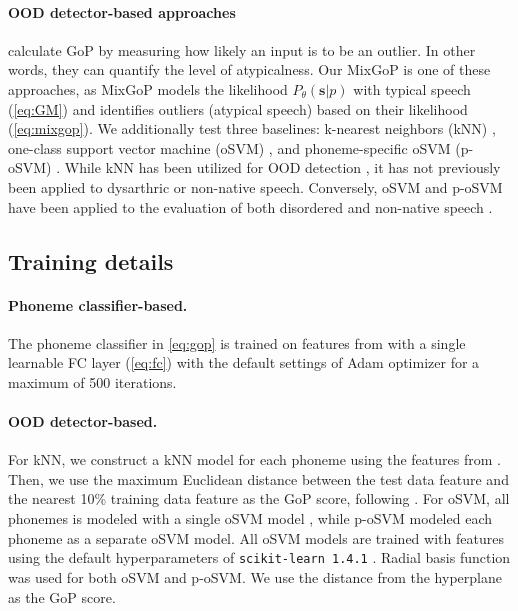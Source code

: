 \paragraph{OOD detector-based approaches} calculate GoP by measuring how likely an input is to be an outlier.
In other words, they can quantify the level of atypicalness.
Our MixGoP is one of these approaches, as MixGoP models the likelihood $P_\theta(\mathbf{s}|p)$ with typical speech (\cref{eq:GM}) and identifies outliers (atypical speech) based on their likelihood (\cref{eq:mixgop}). 
We additionally test three baselines: k-nearest neighbors (kNN) \citep{sun2022out}, one-class support vector machine (oSVM) \citep{scholkopf2001estimating}, and phoneme-specific oSVM (p-oSVM) \citep{shahin2019anomaly}. 
While kNN has been utilized for OOD detection \citep{sun2022out}, it has not previously been applied to dysarthric or non-native speech.
Conversely, oSVM and p-oSVM have been applied to the evaluation of both disordered and non-native speech \citep{shahin2019anomaly, shahin2023phonological}.


\subsection{Training details}\label{subsec:training}
\paragraph{Phoneme classifier-based.}
The phoneme classifier in \cref{eq:gop} is trained on features from  with a single learnable FC layer (\cref{eq:fc}) with the default settings of Adam optimizer \citep{DBLP:journals/corr/KingmaB14} for a maximum of 500 iterations.


\paragraph{OOD detector-based.}
For kNN, we construct a kNN model for each phoneme using the features from .
Then, we use the maximum Euclidean distance between the test data feature and the nearest 10\% training data feature as the GoP score, following \citet{sun2022out}.
For oSVM, all phonemes is modeled with a single oSVM model \citep{shahin2023phonological}, while p-oSVM modeled each phoneme as a separate oSVM model.
All oSVM models are trained with features using the default hyperparameters of \texttt{scikit-learn 1.4.1} \citep{scikit-learn}.
Radial basis function was used for both oSVM and p-oSVM.
We use the distance from the hyperplane as the GoP score.


